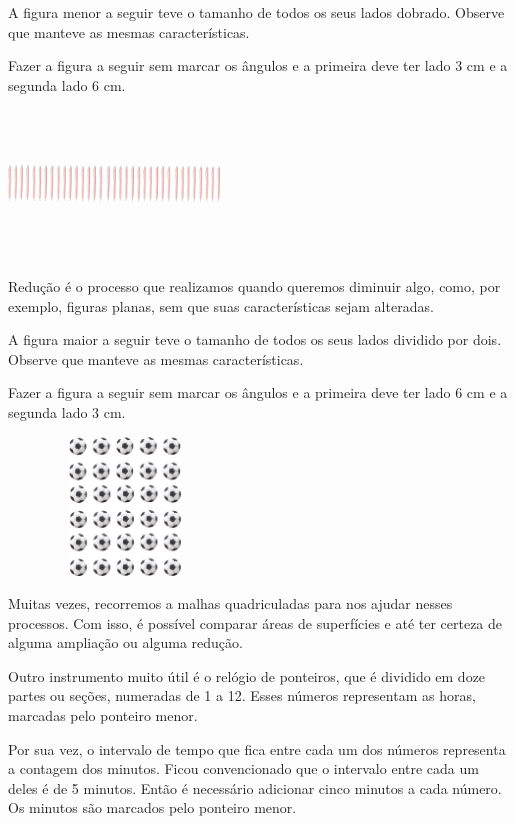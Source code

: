 \begin{mdframed}[linewidth=2pt,linecolor=salmao,roundcorner=2pt]
\begin{itemize}
{\begin{itemize}
\begin{escolha}
{A figura menor a seguir teve o tamanho de todos os seus lados dobrado. Observe que manteve as mesmas
características.

Fazer a figura a seguir sem marcar os ângulos e a primeira deve ter lado
3 cm e a segunda lado 6 cm.

\includegraphics[width=2.21154in,height=1.55185in]{media/image56.png}

Redução é o processo que realizamos quando queremos diminuir algo,
como, por exemplo, figuras planas, sem que suas características
sejam alteradas.

A figura maior a seguir teve o tamanho de todos os seus lados dividido por dois. Observe que manteve as
mesmas características.

Fazer a figura a seguir sem marcar os ângulos e a primeira deve ter lado
6 cm e a segunda lado 3 cm.

\includegraphics[width=2.44231in,height=1.44820in]{media/image57.png}

Muitas vezes, recorremos a malhas quadriculadas para nos
ajudar nesses processos. Com isso, é possível comparar áreas de
superfícies e até ter certeza de alguma ampliação ou alguma redução.

Outro instrumento muito útil é o relógio de ponteiros, que é dividido em doze partes ou
seções, numeradas de 1 a 12. Esses números representam as horas, marcadas pelo ponteiro menor.

Por sua vez, o intervalo de tempo que fica entre cada um dos números
representa a contagem dos minutos. Ficou convencionado que o
intervalo entre cada um deles é de 5 minutos. Então é necessário adicionar cinco minutos a cada número. Os minutos são marcados pelo ponteiro menor.

}
\end{escolha}
\end{itemize}}
\end{itemize}
\end{mdframed}
